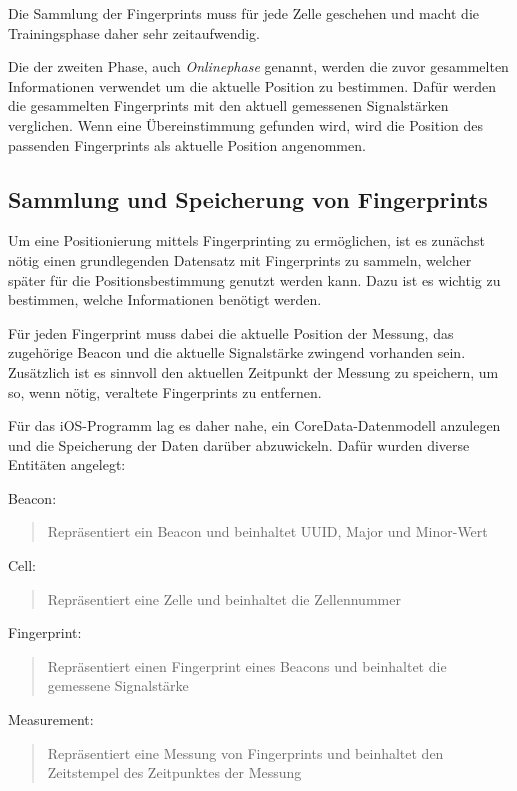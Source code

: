 Die Sammlung der Fingerprints muss für jede Zelle geschehen und macht die Trainingsphase daher sehr zeitaufwendig. 

Die der zweiten Phase, auch \emph{Onlinephase} genannt, werden die zuvor gesammelten Informationen verwendet um die aktuelle Position zu bestimmen. 
Dafür werden die gesammelten Fingerprints mit den aktuell gemessenen Signalstärken verglichen. Wenn eine Übereinstimmung gefunden wird, wird die Position des passenden Fingerprints als aktuelle Position angenommen.


\subsection{Sammlung und Speicherung von Fingerprints}
\label{sec:implementation:fingerprinting:collecting}
Um eine Positionierung mittels Fingerprinting zu ermöglichen, ist es zunächst nötig einen grundlegenden Datensatz mit Fingerprints zu sammeln, welcher später für die Positionsbestimmung genutzt werden kann. Dazu ist es wichtig zu bestimmen, welche Informationen benötigt werden.

Für jeden Fingerprint muss dabei die aktuelle Position der Messung, das zugehörige Beacon und die aktuelle Signalstärke zwingend vorhanden sein.
Zusätzlich ist es sinnvoll den aktuellen Zeitpunkt der Messung zu speichern, um so, wenn nötig, veraltete Fingerprints zu entfernen. 

Für das iOS-Programm lag es daher nahe, ein CoreData-Datenmodell anzulegen und die Speicherung der Daten darüber abzuwickeln.
Dafür wurden diverse Entitäten angelegt:

Beacon:
	\begin{quote}Repräsentiert ein Beacon und beinhaltet UUID, Major und Minor-Wert\end{quote}
Cell:
	\begin{quote}Repräsentiert eine Zelle und beinhaltet die Zellennummer\end{quote}
Fingerprint:
	\begin{quote}Repräsentiert einen Fingerprint eines Beacons und beinhaltet die gemessene Signalstärke\end{quote}
Measurement:
	\begin{quote}Repräsentiert eine Messung von Fingerprints und beinhaltet den Zeitstempel des Zeitpunktes der Messung\end{quote}

